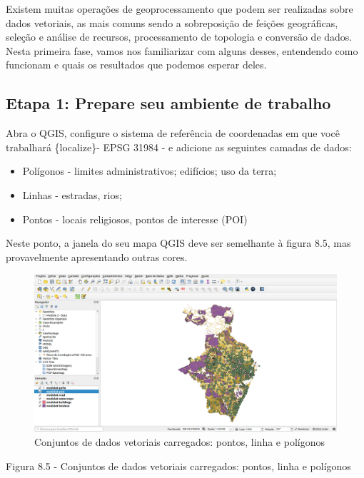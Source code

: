 \documentclass[
]{krantz}
\providecommand{\tightlist}{%
  \setlength{\itemsep}{0pt}\setlength{\parskip}{0pt}}
\begin{document}
Existem muitas operações de geoprocessamento que podem ser realizadas sobre dados vetoriais, as mais comuns sendo a sobreposição de feições geográficas, seleção e análise de recursos, processamento de topologia e conversão de dados. Nesta primeira fase, vamos nos familiarizar com alguns desses, entendendo como funcionam e quais os resultados que podemos esperar deles.

\hypertarget{etapa-1-prepare-seu-ambiente-de-trabalho}{%
\subsection{Etapa 1: Prepare seu ambiente de trabalho}\label{etapa-1-prepare-seu-ambiente-de-trabalho}}

Abra o QGIS, configure o sistema de referência de coordenadas em que você trabalhará \{localize\}- EPSG 31984 - e adicione as seguintes camadas de dados:

\begin{itemize}
\tightlist
\item
  Polígonos - limites administrativos; edifícios; uso da terra;
\item
  Linhas - estradas, rios;
\item
  Pontos - locais religiosos, pontos de interesse (POI)
\end{itemize}

Neste ponto, a janela do seu mapa QGIS deve ser semelhante à figura 8.5, mas provavelmente apresentando outras cores.

\begin{figure}
\centering
\includegraphics{media/modulo8/fig85.png}
\caption{Conjuntos de dados vetoriais carregados: pontos, linha e polígonos}
\end{figure}

Figura 8.5 - Conjuntos de dados vetoriais carregados: pontos, linha e polígonos
\end{document}

